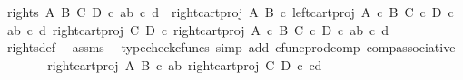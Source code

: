\begin{isabellebody}
\ {\isachardoublequoteopen}rights\ A\ B\ C\ D\ {\isasymcirc}\isactrlsub c\ {\isasymlangle}{\isasymlangle}a{\isacharcomma}{\kern0pt}b{\isasymrangle}{\isacharcomma}{\kern0pt}\ {\isasymlangle}c{\isacharcomma}{\kern0pt}\ d{\isasymrangle}{\isasymrangle}\ {\isacharequal}{\kern0pt}\ {\isasymlangle}right{\isacharunderscore}{\kern0pt}cart{\isacharunderscore}{\kern0pt}proj\ A\ B\ {\isasymcirc}\isactrlsub c\ left{\isacharunderscore}{\kern0pt}cart{\isacharunderscore}{\kern0pt}proj\ {\isacharparenleft}{\kern0pt}A\ {\isasymtimes}\isactrlsub c\ B{\isacharparenright}{\kern0pt}\ {\isacharparenleft}{\kern0pt}C\ {\isasymtimes}\isactrlsub c\ D{\isacharparenright}{\kern0pt}\ {\isasymcirc}\isactrlsub c\ {\isasymlangle}{\isasymlangle}a{\isacharcomma}{\kern0pt}b{\isasymrangle}{\isacharcomma}{\kern0pt}\ {\isasymlangle}c{\isacharcomma}{\kern0pt}\ d{\isasymrangle}{\isasymrangle}{\isacharcomma}{\kern0pt}\ right{\isacharunderscore}{\kern0pt}cart{\isacharunderscore}{\kern0pt}proj\ C\ D\ {\isasymcirc}\isactrlsub c\ right{\isacharunderscore}{\kern0pt}cart{\isacharunderscore}{\kern0pt}proj\ {\isacharparenleft}{\kern0pt}A\ {\isasymtimes}\isactrlsub c\ B{\isacharparenright}{\kern0pt}\ {\isacharparenleft}{\kern0pt}C\ {\isasymtimes}\isactrlsub c\ D{\isacharparenright}{\kern0pt}\ {\isasymcirc}\isactrlsub c\ {\isasymlangle}{\isasymlangle}a{\isacharcomma}{\kern0pt}b{\isasymrangle}{\isacharcomma}{\kern0pt}\ {\isasymlangle}c{\isacharcomma}{\kern0pt}\ d{\isasymrangle}{\isasymrangle}{\isasymrangle}{\isachardoublequoteclose}\isanewline
\ \ \ \ \isamarkupfalse%
\ rights{\isacharunderscore}{\kern0pt}def\ \isamarkupfalse%
\ assms\ \isamarkupfalse%
\ {\isacharparenleft}{\kern0pt}typecheck{\isacharunderscore}{\kern0pt}cfuncs{\isacharcomma}{\kern0pt}\ simp\ add{\isacharcolon}{\kern0pt}\ cfunc{\isacharunderscore}{\kern0pt}prod{\isacharunderscore}{\kern0pt}comp\ comp{\isacharunderscore}{\kern0pt}associative{}{\isacharparenright}{\kern0pt}\isanewline
\ \ \isamarkupfalse%
\ \isamarkupfalse%
\ {\isachardoublequoteopen}{\isachardot}{\kern0pt}{\isachardot}{\kern0pt}{\isachardot}{\kern0pt}\ {\isacharequal}{\kern0pt}\ {\isasymlangle}right{\isacharunderscore}{\kern0pt}cart{\isacharunderscore}{\kern0pt}proj\ A\ B\ {\isasymcirc}\isactrlsub c\ {\isasymlangle}a{\isacharcomma}{\kern0pt}b{\isasymrangle}{\isacharcomma}{\kern0pt}\ right{\isacharunderscore}{\kern0pt}cart{\isacharunderscore}{\kern0pt}proj\ C\ D\ {\isasymcirc}\isactrlsub c\ {\isasymlangle}c{\isacharcomma}{\kern0pt}d{\isasymrangle}{\isasymrangle}{\isachardoublequoteclose}\isanewline

\end{isabellebody}
